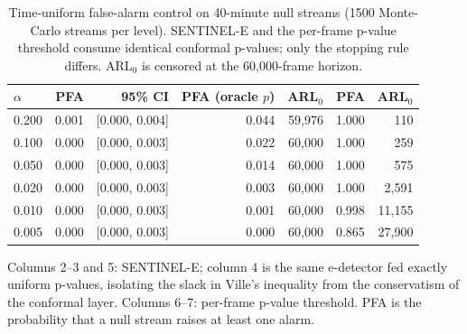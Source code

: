 \begin{table}[t]
\centering
\caption{Time-uniform false-alarm control on 40-minute null streams (1500 Monte-Carlo streams per level). SENTINEL-E and the per-frame p-value threshold consume identical conformal p-values; only the stopping rule differs. ARL$_0$ is censored at the 60{,}000-frame horizon.}
\label{tab:validity}
\begin{tabular}{lrrrrrr}
\toprule
$\alpha$ & PFA & 95\% CI & PFA (oracle $p$) & ARL$_0$ & PFA & ARL$_0$ \\
\midrule
0.200 & 0.001 & [0.000, 0.004] & 0.044 & 59,976 & 1.000 & 110 \\
0.100 & 0.000 & [0.000, 0.003] & 0.022 & 60,000 & 1.000 & 259 \\
0.050 & 0.000 & [0.000, 0.003] & 0.014 & 60,000 & 1.000 & 575 \\
0.020 & 0.000 & [0.000, 0.003] & 0.003 & 60,000 & 1.000 & 2,591 \\
0.010 & 0.000 & [0.000, 0.003] & 0.001 & 60,000 & 0.998 & 11,155 \\
0.005 & 0.000 & [0.000, 0.003] & 0.000 & 60,000 & 0.865 & 27,900 \\
\bottomrule
\end{tabular}
\begin{minipage}{\linewidth}\vspace{2pt}\footnotesize Columns 2--3 and 5: SENTINEL-E; column 4 is the same e-detector fed exactly uniform p-values, isolating the slack in Ville's inequality from the conservatism of the conformal layer. Columns 6--7: per-frame p-value threshold. PFA is the probability that a null stream raises at least one alarm.\end{minipage}
\end{table}
